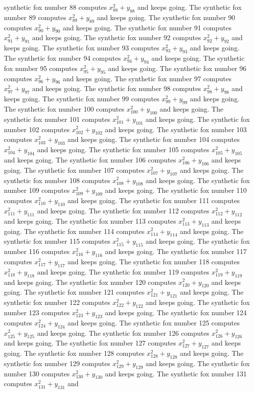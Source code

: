 \documentclass{article}
\begin{document}
synthetic fox number 88 computes $x_{88}^2 + y_{88}$ and keeps going. The synthetic fox number 89 computes $x_{89}^2 + y_{89}$ and keeps going. The synthetic fox number 90 computes $x_{90}^2 + y_{90}$ and keeps going. The synthetic fox number 91 computes $x_{91}^2 + y_{91}$ and keeps going. The synthetic fox number 92 computes $x_{92}^2 + y_{92}$ and keeps going. The synthetic fox number 93 computes $x_{93}^2 + y_{93}$ and keeps going. The synthetic fox number 94 computes $x_{94}^2 + y_{94}$ and keeps going. The synthetic fox number 95 computes $x_{95}^2 + y_{95}$ and keeps going. The synthetic fox number 96 computes $x_{96}^2 + y_{96}$ and keeps going. The synthetic fox number 97 computes $x_{97}^2 + y_{97}$ and keeps going. The synthetic fox number 98 computes $x_{98}^2 + y_{98}$ and keeps going. The synthetic fox number 99 computes $x_{99}^2 + y_{99}$ and keeps going. The synthetic fox number 100 computes $x_{100}^2 + y_{100}$ and keeps going. The synthetic fox number 101 computes $x_{101}^2 + y_{101}$ and keeps going. The synthetic fox number 102 computes $x_{102}^2 + y_{102}$ and keeps going. The synthetic fox number 103 computes $x_{103}^2 + y_{103}$ and keeps going. The synthetic fox number 104 computes $x_{104}^2 + y_{104}$ and keeps going. The synthetic fox number 105 computes $x_{105}^2 + y_{105}$ and keeps going. The synthetic fox number 106 computes $x_{106}^2 + y_{106}$ and keeps going. The synthetic fox number 107 computes $x_{107}^2 + y_{107}$ and keeps going. The synthetic fox number 108 computes $x_{108}^2 + y_{108}$ and keeps going. The synthetic fox number 109 computes $x_{109}^2 + y_{109}$ and keeps going. The synthetic fox number 110 computes $x_{110}^2 + y_{110}$ and keeps going. The synthetic fox number 111 computes $x_{111}^2 + y_{111}$ and keeps going. The synthetic fox number 112 computes $x_{112}^2 + y_{112}$ and keeps going. The synthetic fox number 113 computes $x_{113}^2 + y_{113}$ and keeps going. The synthetic fox number 114 computes $x_{114}^2 + y_{114}$ and keeps going. The synthetic fox number 115 computes $x_{115}^2 + y_{115}$ and keeps going. The synthetic fox number 116 computes $x_{116}^2 + y_{116}$ and keeps going. The synthetic fox number 117 computes $x_{117}^2 + y_{117}$ and keeps going. The synthetic fox number 118 computes $x_{118}^2 + y_{118}$ and keeps going. The synthetic fox number 119 computes $x_{119}^2 + y_{119}$ and keeps going. The synthetic fox number 120 computes $x_{120}^2 + y_{120}$ and keeps going. The synthetic fox number 121 computes $x_{121}^2 + y_{121}$ and keeps going. The synthetic fox number 122 computes $x_{122}^2 + y_{122}$ and keeps going. The synthetic fox number 123 computes $x_{123}^2 + y_{123}$ and keeps going. The synthetic fox number 124 computes $x_{124}^2 + y_{124}$ and keeps going. The synthetic fox number 125 computes $x_{125}^2 + y_{125}$ and keeps going. The synthetic fox number 126 computes $x_{126}^2 + y_{126}$ and keeps going. The synthetic fox number 127 computes $x_{127}^2 + y_{127}$ and keeps going. The synthetic fox number 128 computes $x_{128}^2 + y_{128}$ and keeps going. The synthetic fox number 129 computes $x_{129}^2 + y_{129}$ and keeps going. The synthetic fox number 130 computes $x_{130}^2 + y_{130}$ and keeps going. The synthetic fox number 131 computes $x_{131}^2 + y_{131}$ and 
\end{document}
